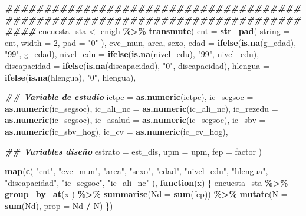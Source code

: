 \documentclass[
  12pt,
]{book}
\newenvironment{Shaded}{\begin{snugshade}}{\end{snugshade}}
\newcommand{\AttributeTok}[1]{\textcolor[rgb]{0.13,0.29,0.53}{#1}}
\newcommand{\ControlFlowTok}[1]{\textcolor[rgb]{0.13,0.29,0.53}{\textbf{#1}}}
\newcommand{\DecValTok}[1]{\textcolor[rgb]{0.00,0.00,0.81}{#1}}
\newcommand{\DocumentationTok}[1]{\textcolor[rgb]{0.56,0.35,0.01}{\textbf{\textit{#1}}}}
\newcommand{\FunctionTok}[1]{\textcolor[rgb]{0.13,0.29,0.53}{\textbf{#1}}}
\newcommand{\NormalTok}[1]{#1}
\newcommand{\OtherTok}[1]{\textcolor[rgb]{0.56,0.35,0.01}{#1}}
\newcommand{\SpecialCharTok}[1]{\textcolor[rgb]{0.81,0.36,0.00}{\textbf{#1}}}
\newcommand{\StringTok}[1]{\textcolor[rgb]{0.31,0.60,0.02}{#1}}
\begin{document}
\begin{Shaded}
\begin{Highlighting}[]
\DocumentationTok{\#\#\#\#\#\#\#\#\#\#\#\#\#\#\#\#\#\#\#\#\#\#\#\#\#\#\#\#\#\#\#\#\#\#\#\#\#\#\#\#\#\#\#\#\#\#\#\#\#\#\#\#\#\#\#\#\#\#\#\#\#\#\#\#\#\#\#\#\#\#\#\#\#\#\#\#\#\#\#\#}
\NormalTok{encuesta\_sta }\OtherTok{\textless{}{-}}\NormalTok{ enigh }\SpecialCharTok{\%\textgreater{}\%}
  \FunctionTok{transmute}\NormalTok{(}
    \AttributeTok{ent =} \FunctionTok{str\_pad}\NormalTok{(}
      \AttributeTok{string =}\NormalTok{ ent,}
      \AttributeTok{width =} \DecValTok{2}\NormalTok{,}
      \AttributeTok{pad =} \StringTok{"0"}
\NormalTok{    ),}
\NormalTok{    cve\_mun,}
\NormalTok{    area,}
\NormalTok{    sexo,}
    \AttributeTok{edad =} \FunctionTok{ifelse}\NormalTok{(}\FunctionTok{is.na}\NormalTok{(g\_edad), }\StringTok{"99"}\NormalTok{, g\_edad),}
    \AttributeTok{nivel\_edu =} \FunctionTok{ifelse}\NormalTok{(}\FunctionTok{is.na}\NormalTok{(nivel\_edu), }\StringTok{"99"}\NormalTok{, nivel\_edu),}
    \AttributeTok{discapacidad =} \FunctionTok{ifelse}\NormalTok{(}\FunctionTok{is.na}\NormalTok{(discapacidad), }\StringTok{"0"}\NormalTok{, discapacidad),}
    \AttributeTok{hlengua =} \FunctionTok{ifelse}\NormalTok{(}\FunctionTok{is.na}\NormalTok{(hlengua), }\StringTok{"0"}\NormalTok{, hlengua),}
    
    \DocumentationTok{\#\# Variable de estudio}
    \AttributeTok{ictpc =} \FunctionTok{as.numeric}\NormalTok{(ictpc),}
    \AttributeTok{ic\_segsoc =} \FunctionTok{as.numeric}\NormalTok{(ic\_segsoc),}
    \AttributeTok{ic\_ali\_nc =} \FunctionTok{as.numeric}\NormalTok{(ic\_ali\_nc),}
    \AttributeTok{ic\_rezedu =} \FunctionTok{as.numeric}\NormalTok{(ic\_segsoc),}
    \AttributeTok{ic\_asalud =} \FunctionTok{as.numeric}\NormalTok{(ic\_segsoc),}
    \AttributeTok{ic\_sbv =} \FunctionTok{as.numeric}\NormalTok{(ic\_sbv\_hog),}
    \AttributeTok{ic\_cv =} \FunctionTok{as.numeric}\NormalTok{(ic\_cv\_hog),}
    
    \DocumentationTok{\#\# Variables diseño}
    \AttributeTok{estrato =}\NormalTok{ est\_dis,}
    \AttributeTok{upm =}\NormalTok{ upm,}
    \AttributeTok{fep =}\NormalTok{ factor}
\NormalTok{  )}

\FunctionTok{map}\NormalTok{(}\FunctionTok{c}\NormalTok{(}
  \StringTok{"ent"}\NormalTok{,}
  \StringTok{"cve\_mun"}\NormalTok{,}
  \StringTok{"area"}\NormalTok{,}
  \StringTok{"sexo"}\NormalTok{,}
  \StringTok{"edad"}\NormalTok{,}
  \StringTok{"nivel\_edu"}\NormalTok{,}
  \StringTok{"hlengua"}\NormalTok{,}
  \StringTok{"discapacidad"}\NormalTok{,}
  \StringTok{"ic\_segsoc"}\NormalTok{,}
  \StringTok{"ic\_ali\_nc"}
\NormalTok{),}
\ControlFlowTok{function}\NormalTok{(x) \{}
\NormalTok{  encuesta\_sta }\SpecialCharTok{\%\textgreater{}\%} \FunctionTok{group\_by\_at}\NormalTok{(x ) }\SpecialCharTok{\%\textgreater{}\%}
    \FunctionTok{summarise}\NormalTok{(}\AttributeTok{Nd =} \FunctionTok{sum}\NormalTok{(fep)) }\SpecialCharTok{\%\textgreater{}\%} 
    \FunctionTok{mutate}\NormalTok{(}\AttributeTok{N =} \FunctionTok{sum}\NormalTok{(Nd),}
           \AttributeTok{prop =}\NormalTok{ Nd }\SpecialCharTok{/}\NormalTok{ N)}
\NormalTok{\})}


\end{Highlighting}
\end{Shaded}
\end{document}

